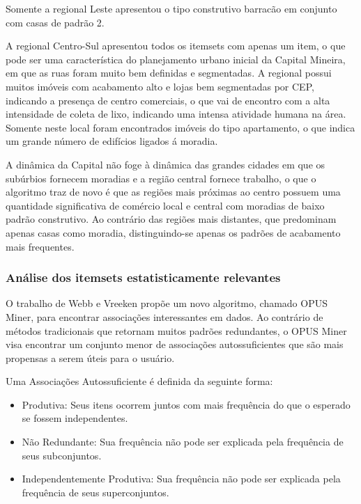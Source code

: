 \documentclass[12pt]{article}
\begin{document}
Somente a regional Leste apresentou o tipo construtivo barracão em conjunto com casas de padrão 2.

A regional Centro-Sul apresentou todos os itemsets com apenas um item, o que pode ser uma característica do planejamento urbano inicial da Capital Mineira, em que as ruas foram muito bem definidas e segmentadas. A regional possui muitos imóveis com acabamento alto e lojas bem segmentadas por CEP, indicando a presença de centro comerciais, o que vai de encontro com a alta intensidade de coleta de lixo, indicando uma intensa atividade humana na área. Somente neste local foram encontrados imóveis do tipo apartamento, o que indica um grande número de edifícios ligados á moradia.

A dinâmica da Capital não foge à dinâmica das grandes cidades em que os subúrbios fornecem moradias e a região central fornece trabalho, o que o algoritmo traz de novo é que as regiões mais próximas ao centro possuem uma quantidade significativa de comércio local e central com moradias de baixo padrão construtivo. Ao contrário das regiões mais distantes, que predominam apenas casas como moradia, distinguindo-se apenas os padrões de acabamento mais frequentes. 

\subsubsection{Análise dos itemsets estatisticamente relevantes}
O trabalho de Webb e Vreeken \cite{webb2013efficient} propõe um novo algoritmo, chamado OPUS Miner, para encontrar associações interessantes em dados. Ao contrário de métodos tradicionais que retornam muitos padrões redundantes, o OPUS Miner visa encontrar um conjunto menor de associações autossuficientes que são mais propensas a serem úteis para o usuário. 

Uma Associações Autossuficiente é definida da seguinte forma: 
\begin{itemize}
    \item Produtiva: Seus itens ocorrem juntos com mais frequência do que o esperado se fossem independentes.
    \item Não Redundante: Sua frequência não pode ser explicada pela frequência de seus subconjuntos. 
    \item Independentemente Produtiva: Sua frequência não pode ser explicada pela frequência de seus superconjuntos. 
\end{itemize}
\end{document}
